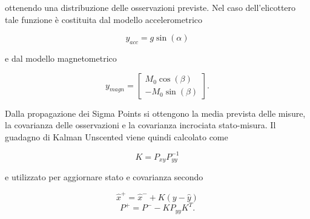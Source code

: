 \documentclass[12pt,a4paper]{article}
\begin{document}
ottenendo una distribuzione delle osservazioni previste.
Nel caso dell'elicottero tale funzione è costituita dal modello accelerometrico

\begin{equation}
y_{acc} = g\sin(\alpha)
\end{equation}

e dal modello magnetometrico

\begin{equation}
y_{magn} =
\begin{bmatrix}
M_0\cos(\beta) \\
-M_0\sin(\beta)
\end{bmatrix}.
\end{equation}

Dalla propagazione dei Sigma Points si ottengono la media prevista delle misure, la covarianza delle osservazioni e la covarianza incrociata stato-misura.
Il guadagno di Kalman Unscented viene quindi calcolato come

\begin{equation}
K = P_{xy} P_{yy}^{-1}
\end{equation}

e utilizzato per aggiornare stato e covarianza secondo

\begin{equation}
\hat{x}^{+} = \hat{x}^{-} + K(y-\hat{y})
\end{equation}
\begin{equation}
P^{+} = P^{-} - K P_{yy} K^T.
\end{equation}
\end{document}
